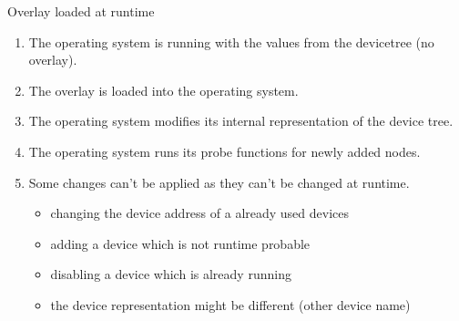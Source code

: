 \documentclass[aspectratio=169]{beamer}
\newcommand{\sectiontitle}{}
\begin{document}
\begin{frame}{Overlay loaded at runtime}{\sectiontitle}
	\begin{enumerate}
		\item The operating system is running with the values from the devicetree (no
			  overlay).
		\item The overlay is loaded into the operating system.
		\item The operating system modifies its internal representation of the device tree.
		\item The operating system runs its probe functions for newly added nodes.
		\item Some changes can't be applied as they can't be changed at runtime.
		\begin{itemize}
			\item changing the device address of a already used devices
			\item adding a device which is not runtime probable
			\item disabling a device which is already running
			\item the device representation might be different (other device name)
		\end{itemize}
	\end{enumerate}
\end{frame}
\end{document}
